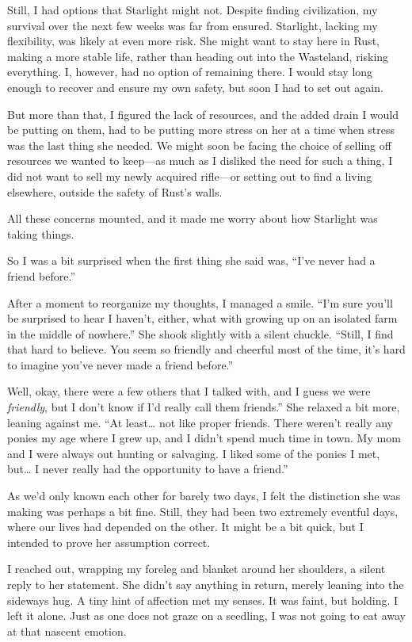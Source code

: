 Still, I had options that Starlight might not. Despite finding civilization, my survival over the next few weeks was far from ensured. Starlight, lacking my flexibility, was likely at even more risk. She might want to stay here in Rust, making a more stable life, rather than heading out into the Wasteland, risking everything. I, however, had no option of remaining there. I would stay long enough to recover and ensure my own safety, but soon I had to set out again.

But more than that, I figured the lack of resources, and the added drain I would be putting on them, had to be putting more stress on her at a time when stress was the last thing she needed. We might soon be facing the choice of selling off resources we wanted to keep—as much as I disliked the need for such a thing, I did not want to sell my newly acquired rifle—or setting out to find a living elsewhere, outside the safety of Rust’s walls.

All these concerns mounted, and it made me worry about how Starlight was taking things.

So I was a bit surprised when the first thing she said was, “I’ve never had a friend before.”

After a moment to reorganize my thoughts, I managed a smile. “I’m sure you’ll be surprised to hear I haven’t, either, what with growing up on an isolated farm in the middle of nowhere.” She shook slightly with a silent chuckle. “Still, I find that hard to believe. You seem so friendly and cheerful most of the time, it’s hard to imagine you’ve never made a friend before.”

\leavevmode{}Well, okay, there were a few others that I talked with, and I guess we were \textit{friendly}, but I don’t know if I’d really call them friends.” She relaxed a bit more, leaning against me. “At least… not like proper friends. There weren’t really any ponies my age where I grew up, and I didn’t spend much time in town. My mom and I were always out hunting or salvaging. I liked some of the ponies I met, but… I never really had the opportunity to have a friend.”

As we’d only known each other for barely two days, I felt the distinction she was making was perhaps a bit fine. Still, they had been two extremely eventful days, where our lives had depended on the other. It might be a bit quick, but I intended to prove her assumption correct.

I reached out, wrapping my foreleg and blanket around her shoulders, a silent reply to her statement. She didn’t say anything in return, merely leaning into the sideways hug. A tiny hint of affection met my senses. It was faint, but holding. I left it alone. Just as one does not graze on a seedling, I was not going to eat away at that nascent emotion.

